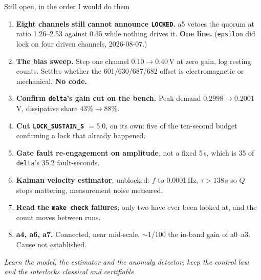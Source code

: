 \documentclass[aspectratio=169]{beamer}
\begin{document}
\begin{frame}{Still open, in the order I would do them}
  \footnotesize
  \begin{enumerate}\setlength{\itemsep}{1.5pt}
    \item \alert{\textbf{Eight channels still cannot announce \texttt{LOCKED}.}}
          a5 vetoes the quorum at ratio 1.26--2.53 against 0.35 while nothing
          drives it. \textbf{One line.} (\texttt{epsilon} did lock on four
          driven channels, 2026-08-07.)
    \item \textbf{The bias sweep.} Step one channel $0.10 \to 0.40$\,V at zero
          gain, log resting counts. Settles whether the 601/630/687/682 offset
          is electromagnetic or mechanical. \textbf{No code.}
    \item \textbf{Confirm \texttt{delta}'s gain cut on the bench.} Peak demand
          $0.2998 \to 0.2001$\,V, dissipative share $43\% \to 88\%$.
    \item \textbf{Cut \texttt{LOCK\_SUSTAIN\_S} $= 5.0$}, on its own: five of
          the ten-second budget confirming a lock that already happened.
    \item \textbf{Gate fault re-engagement on amplitude}, not a fixed 5\,s,
          which is 35 of \texttt{delta}'s 35.2 fault-seconds.
    \item \textbf{Kalman velocity estimator}, unblocked: $f$ to 0.0001\,Hz,
          $\tau > 138$\,s so $Q$ stops mattering, measurement noise measured.
    \item \textbf{Read the \texttt{make check} failures}; only two have ever
          been looked at, and the count moves between runs.
    \item \textbf{a4, a6, a7.} Connected, near mid-scale, $\sim$1/100 the
          in-band gain of a0--a3. Cause not established.
  \end{enumerate}

  \vspace{1.5mm}
  \centering
  \emph{Learn the model, the estimator and the anomaly detector; keep the
  control law and the interlocks classical and certifiable.}
\end{frame}
\end{document}

